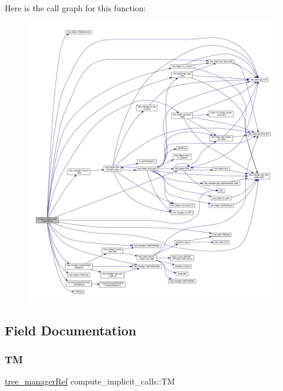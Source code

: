Here is the call graph for this function\+:
\nopagebreak
\begin{figure}[H]
\begin{center}
\leavevmode
\includegraphics[width=350pt]{db/d74/classcompute__implicit__calls_ae2088a9a4859e68a380a05875901b9e3_cgraph}
\end{center}
\end{figure}


\subsection{Field Documentation}
\mbox{\label{classcompute__implicit__calls_ae86cc81a2dacd41fbad0f725dbe1e5f2}} 
\subsubsection{\texorpdfstring{TM}{TM}}
{\footnotesize\ttfamily \hyperlink{tree__manager_8hpp_a96ff150c071ce11a9a7a1e40590f205e}{tree\+\_\+manager\+Ref} compute\+\_\+implicit\+\_\+calls\+::\+TM\hspace{0.3cm}{\ttfamily [private]}}



